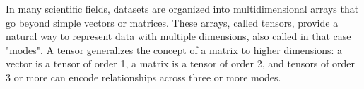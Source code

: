 \documentclass[preprint,12pt]{elsarticle}
\begin{document}


In many scientific fields, datasets are organized into multidimensional arrays that go beyond simple vectors or matrices. These arrays, called tensors, provide a natural way to represent data with multiple dimensions, also called in that case "modes". A tensor generalizes the concept of a matrix to higher dimensions: a vector is a tensor of order 1, a matrix is a tensor of order 2, and tensors of order 3 or more can encode relationships across three or more modes. 
\end{document}
